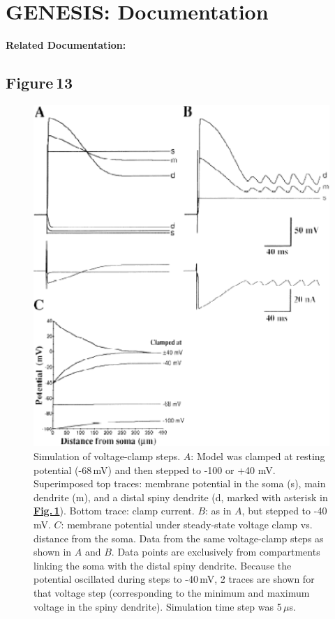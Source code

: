 \documentclass[12pt]{article}
\begin{document}
\section*{GENESIS: Documentation}

{\bf Related Documentation:}

\subsection*{Figure\,13}

\begin{figure}[h]
\centering
   \includegraphics[scale=0.75]{figures/Fig.1.13.eps}
   \caption{Simulation of voltage-clamp steps. $A$: Model was clamped at resting potential (-68\,mV) and then stepped to -100 or +40 mV. Superimposed top traces: membrane potential in the soma (s), main dendrite (m), and a distal spiny dendrite (d, marked with asterisk in \href{pub-purkinje-deschutter1-fig-1/pub-purkinje-deschutter1-fig-1.tex}{\bf Fig.\,1}). Bottom trace: clamp current. $B$: as in $A$, but stepped to -40\,mV. $C$: membrane potential under steady-state voltage clamp vs. distance from the soma. Data from the same voltage-clamp steps as shown in $A$ and $B$. Data points are exclusively from compartments linking the soma with the distal spiny dendrite. Because the potential oscillated during steps to -40\,mV, 2 traces are shown for that voltage step (corresponding to the minimum and maximum voltage in the spiny dendrite). Simulation time step was 5\,$\mu$s.}
   \label{fig:DS1.13}
\end{figure}



\end{document}

